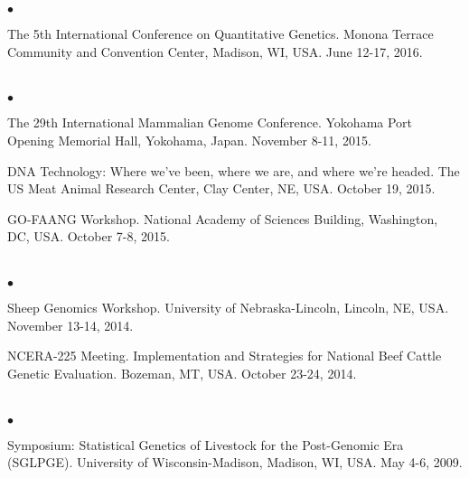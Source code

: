 \documentclass[margin,line,10pt]{res}
\newenvironment{list2}{
  \begin{list}{$\bullet$}{%
      \setlength{\itemsep}{0in}
      \setlength{\parsep}{0in} \setlength{\parskip}{0in}
      \setlength{\topsep}{0in} \setlength{\partopsep}{0in} 
      \setlength{\leftmargin}{0.2in}}}{\end{list}}
\begin{document}
\begin{resume}
\begin{list2}
  \vspace{0.5cm}
  
\item The 5th International Conference on Quantitative Genetics. Monona Terrace Community and Convention Center, Madison, WI, USA. June 12-17, 2016.

\end{list2}  




\section{}
\begin{list2}
  
\item The 29th International Mammalian Genome Conference. Yokohama Port Opening Memorial Hall, Yokohama, Japan. November 8-11, 2015.

  \vspace{0.5cm}
  
  \item DNA Technology: Where we've been, where we are, and where we're headed. The US Meat Animal Research Center, Clay Center, NE, USA. October 19, 2015. 
  
  \vspace{0.5cm}
  
\item GO-FAANG Workshop. National Academy of Sciences Building, Washington, DC, USA. October 7-8, 2015.
\end{list2}  

\section{}
\begin{list2}

\item Sheep Genomics Workshop. University of Nebraska-Lincoln, Lincoln, NE, USA. November 13-14, 2014.  

\vspace{0.5cm}

\item NCERA-225 Meeting. Implementation and Strategies for National Beef Cattle Genetic Evaluation. Bozeman, MT, USA. October 23-24, 2014.  

\end{list2}  




\section{}
\begin{list2}
\item Symposium: Statistical Genetics of Livestock for the Post-Genomic Era (SGLPGE). University of Wisconsin-Madison, Madison, WI, USA. May 4-6, 2009.
\end{list2}  


\end{resume}
\end{document}

